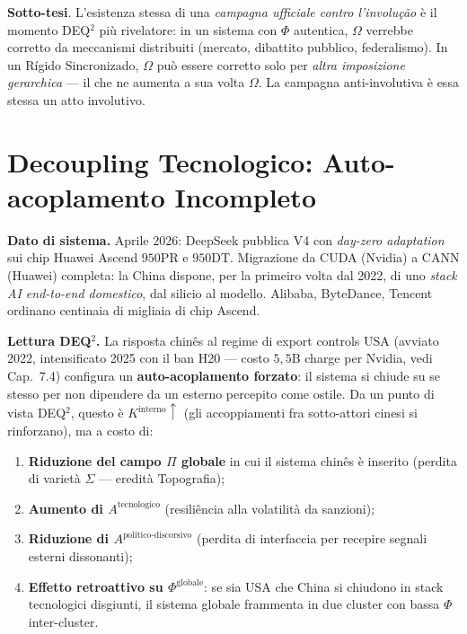 \Conj{} \textbf{Sotto-tesi}. L'esistenza stessa di una \emph{campagna
ufficiale contro l'involução} è il momento DEQ$^2$ più rivelatore: in un
sistema con \(\Phi\) autentica, \(\Omega\) verrebbe corretto da
meccanismi distribuiti (mercato, dibattito pubblico, federalismo). In un
Rígido Sincronizado, \(\Omega\) può essere corretto solo per
\emph{altra imposizione gerarchica} --- il che ne aumenta a sua volta
\(\Omega\). La campagna anti-involutiva è essa stessa un atto
involutivo.



\section{Decoupling Tecnologico: Auto-acoplamento
Incompleto}\label{decoupling-tecnologico-auto-acoplamento-incompleto}

\Proved{} \textbf{Dato di sistema.} Aprile 2026: DeepSeek pubblica V4
con \emph{day-zero adaptation} sui chip Huawei Ascend \(950\)PR e
\(950\)DT. Migrazione da CUDA (Nvidia) a CANN (Huawei) completa: la China
dispone, per la primeiro volta dal 2022, di uno \emph{stack AI end-to-end
domestico}, dal silicio al modello. Alibaba, ByteDance, Tencent ordinano
centinaia di migliaia di chip Ascend.

\Hypoth{} \textbf{Lettura DEQ$^2$.} La risposta chinês al regime di export
controls USA (avviato 2022, intensificato 2025 con il ban H20 --- costo
\(5{,}5\)B charge per Nvidia, vedi Cap.~7.4) configura un
\textbf{auto-acoplamento forzato}: il sistema si chiude su se stesso
per non dipendere da un esterno percepito come ostile. Da un punto di
vista DEQ$^2$, questo è \(K^{\text{interno}} \uparrow\) (gli accoppiamenti
fra sotto-attori cinesi si rinforzano), ma a costo di:

\begin{enumerate}
\def\labelenumi{\arabic{enumi}.}
\tightlist
\item
  \textbf{Riduzione del campo \(\Pi\) globale} in cui il sistema chinês
  è inserito (perdita di varietà \(\Sigma\) --- eredità Topografia);
\item
  \textbf{Aumento di \(A^{\text{tecnologico}}\)} (resiliência alla
  volatilità da sanzioni);
\item
  \textbf{Riduzione di \(A^{\text{politico-discorsivo}}\)} (perdita di
  interfaccia per recepire segnali esterni dissonanti);
\item
  \textbf{Effetto retroattivo su \(\Phi^{\text{globale}}\)}: se sia USA
  che China si chiudono in stack tecnologici disgiunti, il sistema
  globale frammenta in due cluster con bassa \(\Phi\) inter-cluster.
\end{enumerate}


